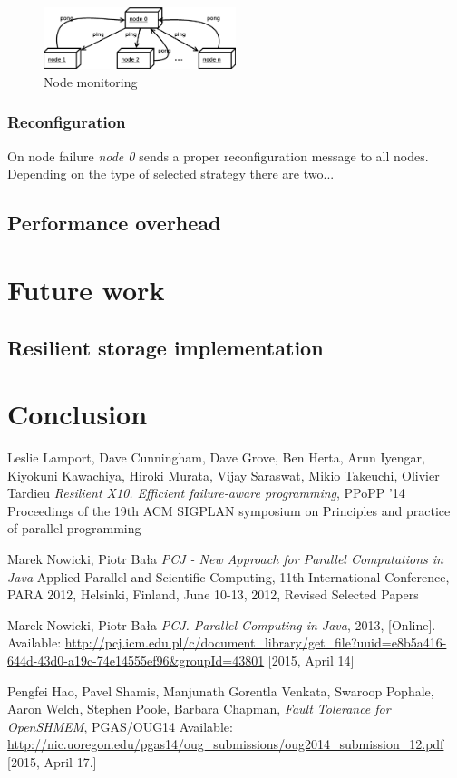 \documentclass{llncs}
\begin{document}
\begin{figure}
  \centering
      \includegraphics[width=0.5\textwidth]{node-monitoring.eps}
  \caption{Node monitoring}
  \label{pinging}
\end{figure}

\subsubsection{Reconfiguration}
On node failure \textit{node 0} sends a proper reconfiguration message to all nodes.
Depending on the type of selected strategy there are two...

\subsection{Performance overhead}

\section{Future work}
\subsection{Resilient storage implementation}

\section{Conclusion}

\begin{thebibliography}{1}

Leslie Lamport, Dave Cunningham, Dave Grove, Ben Herta, Arun Iyengar, Kiyokuni Kawachiya, Hiroki Murata, Vijay Saraswat, Mikio Takeuchi, Olivier Tardieu
\emph{Resilient X10. Efficient failure-aware programming},
PPoPP '14 Proceedings of the 19th ACM SIGPLAN symposium on Principles and practice of parallel programming

Marek Nowicki, Piotr Bała
\emph{PCJ - New Approach for Parallel Computations in Java}
Applied Parallel and Scientific Computing, 11th International Conference, PARA 2012, Helsinki, Finland, June 10-13, 2012, Revised Selected Papers

Marek Nowicki, Piotr Bała
\emph{PCJ. Parallel Computing in Java}, 2013, [Online]. Available: \url{http://pcj.icm.edu.pl/c/document_library/get_file?uuid=e8b5a416-644d-43d0-a19c-74e14555ef96&groupId=43801} [2015, April 14]

Pengfei Hao, Pavel Shamis, Manjunath Gorentla Venkata, Swaroop Pophale, Aaron Welch, Stephen Poole, Barbara Chapman, \emph{Fault Tolerance for OpenSHMEM}, PGAS/OUG14
Available: \url{http://nic.uoregon.edu/pgas14/oug_submissions/oug2014_submission_12.pdf} [2015, April 17.]

\end{thebibliography}
\end{document}
